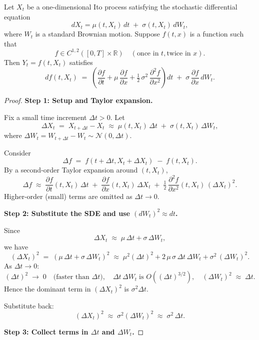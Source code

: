 \begin{theorem}
\label{thm:Ito}
Let $X_t$ be a one-dimensional Ito process satisfying the stochastic differential equation
\[
   dX_t = \mu(t, X_t)\,dt \;+\; \sigma(t, X_t)\, dW_t,
\]
where $W_t$ is a standard Brownian motion. Suppose $f(t, x)$ is a function such that
\[
   f \in C^{1,2}([0,T] \times \mathbb{R}) 
   \quad(\text{once in } t, \text{twice in } x).
\]
Then $Y_t = f(t, X_t)$ satisfies
\[
   df(t, X_t)
   \;=\;
   \left(
     \frac{\partial f}{\partial t} 
     + \mu \,\frac{\partial f}{\partial x} 
     + \tfrac{1}{2}\,\sigma^2 \,\frac{\partial^2 f}{\partial x^2}
   \right)\!dt
   \;+\;
   \sigma \,\frac{\partial f}{\partial x}\,dW_t.
\]
\end{theorem}

\begin{proof}
\textbf{Step 1: Setup and Taylor expansion.}

Fix a small time increment $\Delta t > 0$. Let
\[
   \Delta X_t \;=\; X_{t+\Delta t} - X_t 
   \;\approx\; \mu(t, X_t)\,\Delta t \;+\; \sigma(t, X_t)\,\Delta W_t,
\]
where $\Delta W_t = W_{t+\Delta t} - W_t \sim \mathcal{N}(0,\Delta t)$.

Consider 
\[
   \Delta f \;=\; f(t + \Delta t, X_t + \Delta X_t) \;-\; f(t, X_t).
\]
By a second-order Taylor expansion around $(t, X_t)$,
\[
   \Delta f 
   \;\approx\;
   \frac{\partial f}{\partial t}(t,X_t)\,\Delta t
   \;+\;
   \frac{\partial f}{\partial x}(t,X_t)\,\Delta X_t
   \;+\;
   \tfrac{1}{2}\,\frac{\partial^2 f}{\partial x^2}(t,X_t)\,(\Delta X_t)^2.
\]
Higher-order (small) terms are omitted as $\Delta t \to 0$.

\medskip
\textbf{Step 2: Substitute the SDE and use $(dW_t)^2 \approx dt$.}

Since
\[
   \Delta X_t 
   \;\approx\;
   \mu\,\Delta t + \sigma\,\Delta W_t,
\]
we have
\[
   (\Delta X_t)^2
   \;=\;
   (\mu\,\Delta t + \sigma\,\Delta W_t)^2
   \;\approx\;
   \mu^2 (\Delta t)^2 + 2\,\mu\,\sigma\,\Delta t\,\Delta W_t + \sigma^2\,(\Delta W_t)^2.
\]
As $\Delta t \to 0$:
\[
   (\Delta t)^2 \;\to\; 0 
   \quad\text{(faster than } \Delta t\text{)},
   \quad
   \Delta t \,\Delta W_t \;\text{is } O((\Delta t)^{3/2}),
   \quad
   (\Delta W_t)^2 \;\approx\; \Delta t.
\]
Hence the dominant term in $(\Delta X_t)^2$ is $\sigma^2 \Delta t$.

Substitute back:
\[
   (\Delta X_t)^2 \;\approx\; \sigma^2 (\Delta W_t)^2 \;\approx\; \sigma^2 \,\Delta t.
\]

\medskip
\textbf{Step 3: Collect terms in $\Delta t$ and $\Delta W_t$.}


\end{proof}
